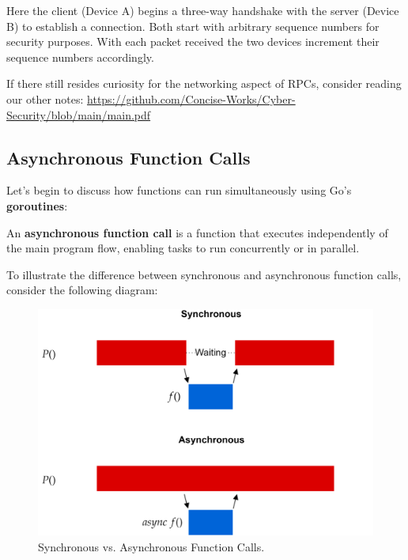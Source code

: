 \noindent
Here the client (Device A) begins a three-way handshake with the server (Device B) to establish a connection. Both start with 
arbitrary sequence numbers for security purposes. With each packet received the two devices increment their sequence numbers accordingly.\\

\begin{Tip} If there still resides curiosity for the networking aspect of RPCs, consider reading our other notes:
    \href{https://github.com/Concise-Works/Cyber-Security/blob/main/main.pdf}{https://github.com/Concise-Works/Cyber-Security/blob/main/main.pdf}
\end{Tip}

\subsection{Asynchronous Function Calls}
Let's begin to discuss how functions can run simultaneously using Go's \textbf{goroutines}:
\begin{Def}

    An \textbf{asynchronous function call} is a function that executes independently of the main program flow, enabling tasks to run concurrently or in parallel.

\end{Def}
\newpage

\noindent
To illustrate the difference between synchronous and asynchronous function calls, consider the following diagram:

\begin{figure}[h]
    \centering
    \includegraphics[width=1\textwidth]{Sections/rpc/Async.png}
    \caption{Synchronous vs. Asynchronous Function Calls.}
    \label{fig:sync_async}
\end{figure}


